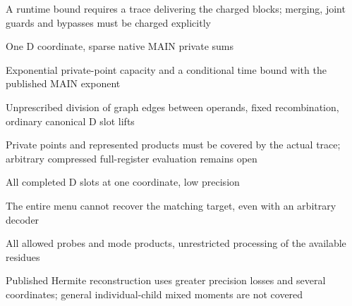 \documentclass[11pt,a4paper]{article}
\newlength{\OfflineResearchTableWidth}
\newcommand{\OfflineResearchRow}{\par}
\newenvironment{OfflineResearchTable}{%
  \par\medskip\begingroup\small\setlength{\parindent}{0pt}%
  \setlength{\parskip}{3pt plus 1pt minus .5pt}%
  \setlength{\OfflineResearchTableWidth}{\linewidth}%
}{%
  \par\endgroup\medskip%
}
\begin{document}
\begin{OfflineResearchTable}
\begin{minipage}[t]{0.23625\OfflineResearchTableWidth}
\end{minipage}\hfill%
\begin{minipage}[t]{0.30240\OfflineResearchTableWidth}\raggedright
A runtime bound requires a trace delivering the charged blocks; merging,
joint guards and bypasses must be charged explicitly
\end{minipage}%
\OfflineResearchRow
\noindent%
\begin{minipage}[t]{0.17955\OfflineResearchTableWidth}\raggedright
One D coordinate, sparse native MAIN private sums
\end{minipage}\hfill%
\begin{minipage}[t]{0.22680\OfflineResearchTableWidth}\raggedright
Exponential
private-point capacity and a conditional time bound with the published
MAIN exponent
\end{minipage}\hfill%
\begin{minipage}[t]{0.23625\OfflineResearchTableWidth}\raggedright
Unprescribed division of graph edges between operands,
fixed recombination, ordinary canonical D slot lifts
\end{minipage}\hfill%
\begin{minipage}[t]{0.30240\OfflineResearchTableWidth}\raggedright
Private points
and represented products must be covered by the actual trace; arbitrary
compressed full-register evaluation remains open
\end{minipage}%
\OfflineResearchRow
\noindent%
\begin{minipage}[t]{0.17955\OfflineResearchTableWidth}\raggedright
All completed D slots at one coordinate, low precision
\end{minipage}\hfill%
\begin{minipage}[t]{0.22680\OfflineResearchTableWidth}\raggedright
The entire menu
cannot recover the matching target, even with an arbitrary decoder
\end{minipage}\hfill%
\begin{minipage}[t]{0.23625\OfflineResearchTableWidth}\raggedright
All
allowed probes and mode products, unrestricted processing of the
available residues
\end{minipage}\hfill%
\begin{minipage}[t]{0.30240\OfflineResearchTableWidth}\raggedright
Published Hermite reconstruction uses greater
precision losses and several coordinates; general individual-child mixed
moments are not covered
\end{minipage}%
\OfflineResearchRow
\noindent%
\begin{minipage}[t]{0.17955\OfflineResearchTableWidth}\raggedright

\end{minipage}
\end{OfflineResearchTable}
\end{document}
